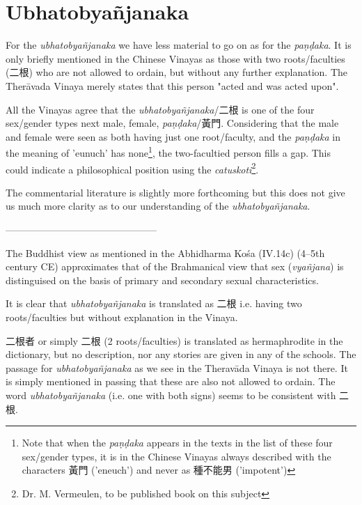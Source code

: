 \section{Ubhatob­yañ­janaka}

For the {\em ubhatob­yañ­janaka} we have less material to go on as for the {\em paṇḍaka}. It is only briefly mentioned in the Chinese Vinayas as those with two roots/faculties (二根) who are not allowed to ordain, but without any further explanation. The Therāvada Vinaya merely states that this person "acted and was acted upon". 

All the Vinayas agree that the {\em ubhatob­yañ­janaka}/二根 is one of the four sex/gender types next male, female, {\em paṇḍaka}/黃門. Considering that the male and female were seen as both having just one root/faculty, and the {\em paṇḍaka} in the meaning of 'eunuch' has none\footnote{Note that when the {\em paṇḍaka} appears in the texts in the list of these four sex/gender types, it is in the Chinese Vinayas always described with the characters 黃門 ('eneuch') and never as 種不能男 ('impotent')}, the two-facultied person fills a gap. This could indicate a philosophical position using the {\em catuskoti}\footnote{Dr. M. Vermeulen, to be published book on this subject}.

The commentarial literature is slightly more forthcoming but this does not give us much more clarity as to our understanding of the {\em ubhatob­yañ­janaka}.



-----------------------------------------------

The Buddhist view as mentioned in the Abhidharma Kośa (IV.14c) (4–5th century CE) approximates that of the Brahmanical view that sex ({\em vyañjana}) is distinguised on the basis of primary and secondary sexual characteristics.

It is clear that {\em ubhatob­yañ­janaka} is translated as 二根 i.e. having two roots/faculties but without explanation in the Vinaya. 

二根者 or simply 二根 (2 roots/faculties) is translated as hermaphrodite in the dictionary, but no description, nor any stories are given in any of the schools. The passage for {\em ubhatob­yañ­janaka} as we see in the Theravāda Vinaya is not there. It is simply mentioned in passing that these are also not allowed to ordain. The word {\em ubhatob­yañ­janaka} (i.e. one with both signs) seems to be consistent with 二根.

